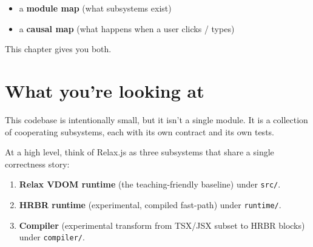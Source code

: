 \begin{itemize}
  \item a \textbf{module map} (what subsystems exist)
  \item a \textbf{causal map} (what happens when a user clicks / types)
\end{itemize}

This chapter gives you both.

\section{What you're looking at}
This codebase is intentionally small, but it isn't a single module.
It is a collection of cooperating subsystems, each with its own contract and its own tests.

At a high level, think of Relax.js as three subsystems that share a single correctness story:

\begin{enumerate}
  \item \textbf{Relax VDOM runtime} (the teaching-friendly baseline) under \texttt{src/}.
  \item \textbf{HRBR runtime} (experimental, compiled fast-path) under \texttt{runtime/}.
  \item \textbf{Compiler} (experimental transform from TSX/JSX subset to HRBR blocks) under \texttt{compiler/}.
\end{enumerate}

